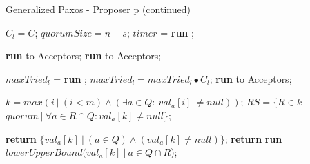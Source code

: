 \documentclass[10pt,pdftex,a4paper]{article}%
\begin{document}
\begin{algorithm}
\caption{Generalized Paxos - Proposer p (continued)}
\begin{algorithmic}[1]
        \State $C_l = C$;
        \State $quorumSize = n-s$;
        \State $timer$ = \textbf{run} ;
        
        \State
            \State \textbf{run}  to Acceptors;
        \Else
            \State \textbf{run}  to Acceptors;
        \EndIf
    \EndFunction
    
    \State
        \State $maxTried_l$ = \textbf{run} ;
        \State $maxTried_l = maxTried_l \bullet C_l$;
        \State \textbf{run}  to Acceptors;
    \EndFunction
    
    \State
        \State $k = max(i\ |\ (i < m) \wedge (\exists a \in Q :\ val_a[i]\ \neq null))$;
        \State $RS = \{R \in k$-$quorum\ |\ \forall a \in R \cap Q : val_a[k] \neq null\}$;
        
        \State
            \State \textbf{return} $\{val_a[k]\ |\ (a \in Q) \wedge (val_a[k] \neq null)\}$;
        \Else
            \State \textbf{return} \textbf{run} $lowerUpperBound(val_a[k]\ |\ a \in Q \cap R$);
            
        \EndIf
    \EndFunction
        
\end{algorithmic}
\end{algorithm}
\end{document}
